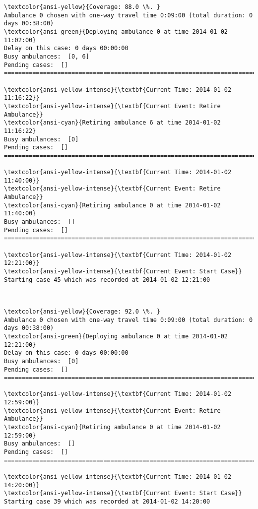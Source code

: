 \documentclass[11pt]{article}
\begin{document}
    \begin{Verbatim}[commandchars=\\\{\}]
\textcolor{ansi-yellow}{Coverage: 88.0 \%. }
Ambulance 0 chosen with one-way travel time 0:09:00 (total duration: 0 days 00:38:00)
\textcolor{ansi-green}{Deploying ambulance 0 at time 2014-01-02 11:02:00}
Delay on this case: 0 days 00:00:00
Busy ambulances:  [0, 6]
Pending cases:  []
========================================================================

\textcolor{ansi-yellow-intense}{\textbf{Current Time: 2014-01-02 11:16:22}}
\textcolor{ansi-yellow-intense}{\textbf{Current Event: Retire Ambulance}}
\textcolor{ansi-cyan}{Retiring ambulance 6 at time 2014-01-02 11:16:22}
Busy ambulances:  [0]
Pending cases:  []
========================================================================

\textcolor{ansi-yellow-intense}{\textbf{Current Time: 2014-01-02 11:40:00}}
\textcolor{ansi-yellow-intense}{\textbf{Current Event: Retire Ambulance}}
\textcolor{ansi-cyan}{Retiring ambulance 0 at time 2014-01-02 11:40:00}
Busy ambulances:  []
Pending cases:  []
========================================================================

\textcolor{ansi-yellow-intense}{\textbf{Current Time: 2014-01-02 12:21:00}}
\textcolor{ansi-yellow-intense}{\textbf{Current Event: Start Case}}
Starting case 45 which was recorded at 2014-01-02 12:21:00

    \end{Verbatim}

    \begin{center}
    \end{center}
    { \hspace*{\fill} \\}
    
    \begin{Verbatim}[commandchars=\\\{\}]
\textcolor{ansi-yellow}{Coverage: 92.0 \%. }
Ambulance 0 chosen with one-way travel time 0:09:00 (total duration: 0 days 00:38:00)
\textcolor{ansi-green}{Deploying ambulance 0 at time 2014-01-02 12:21:00}
Delay on this case: 0 days 00:00:00
Busy ambulances:  [0]
Pending cases:  []
========================================================================

\textcolor{ansi-yellow-intense}{\textbf{Current Time: 2014-01-02 12:59:00}}
\textcolor{ansi-yellow-intense}{\textbf{Current Event: Retire Ambulance}}
\textcolor{ansi-cyan}{Retiring ambulance 0 at time 2014-01-02 12:59:00}
Busy ambulances:  []
Pending cases:  []
========================================================================

\textcolor{ansi-yellow-intense}{\textbf{Current Time: 2014-01-02 14:20:00}}
\textcolor{ansi-yellow-intense}{\textbf{Current Event: Start Case}}
Starting case 39 which was recorded at 2014-01-02 14:20:00

    \end{Verbatim}
\end{document}
